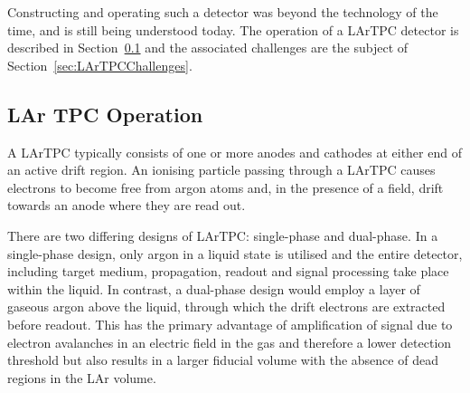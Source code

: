 Constructing and operating such a detector was beyond the technology of the time, and is still being understood today.  The operation of a LArTPC detector is described in Section~\ref{sec:LArTPCOperation} and the associated challenges are the subject of Section~\ref{sec:LArTPCChallenges}.

\subsection{LAr TPC Operation}\label{sec:LArTPCOperation}

A LArTPC typically consists of one or more anodes and cathodes at either end of an active drift region.  An ionising particle passing through a LArTPC causes electrons to become free from argon atoms and, in the presence of a field, drift towards an anode where they are read out.

There are two differing designs of LArTPC: single-phase and dual-phase.  In a single-phase design, only argon in a liquid state is utilised and the entire detector, including target medium, propagation, readout and signal processing take place within the liquid.  In contrast, a dual-phase design would employ a layer of gaseous argon above the liquid, through which the drift electrons are extracted before readout.  This has the primary advantage of amplification of signal due to electron avalanches in an electric field in the gas and therefore a lower detection threshold but also results in a larger fiducial volume with the absence of dead regions in the LAr volume.

